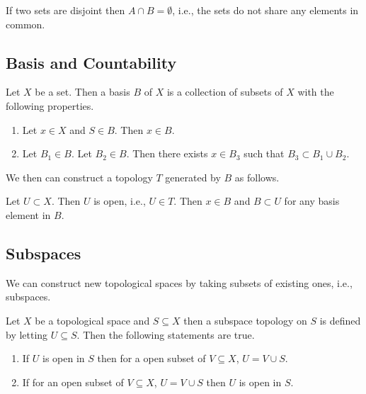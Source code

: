 \documentclass{article}
\newtheorem{theorem}{Theorem}[section]
\newtheorem{proposition}[theorem]{Proposition}
\newtheorem{example}[theorem]{Example}
\begin{document}
If two sets are disjoint then $ A \cap B = \emptyset $, i.e., the sets do not share any elements in common.
\subsection{Basis and Countability}

Let $ X $ be a set. Then a basis $ B $ of $ X $ is a collection of subsets of $ X $ with the following
properties.

\begin{enumerate}
\item Let $ x \in X $ and $ S \in B $. Then $ x \in B $.
\item Let $ B_{1} \in B $. Let $ B_{2} \in B $. Then there exists  $ x \in B_{3} $ such that $ B_{3} \subset B_{1} \cup B_{2} $.
\end{enumerate}

We then can construct a topology $ T $ generated by $ B $ as follows.

Let $ U \subset X $. Then $ U $ is open, i.e., $ U \in T $. Then  $ x \in B $ and $ B \subset U $ for any basis element in $ B $.

\subsection{Subspaces}

We can construct new topological spaces by taking subsets of existing ones, i.e., subspaces.

Let $ X $ be a topological space and $ S \subseteq X $ then a subspace topology on $ S $ is defined
by letting  $ U \subseteq  S $. Then the following statements are true.

\begin{enumerate}
\item If $ U $ is open in $ S $ then for a open subset of $ V \subseteq X $, $ U =  V \cup  S $.
\item If for an open subset of $ V \subseteq X $, $ U =  V \cup  S $ then  $ U $ is open in $ S $.
\end{enumerate}










\end{document}
